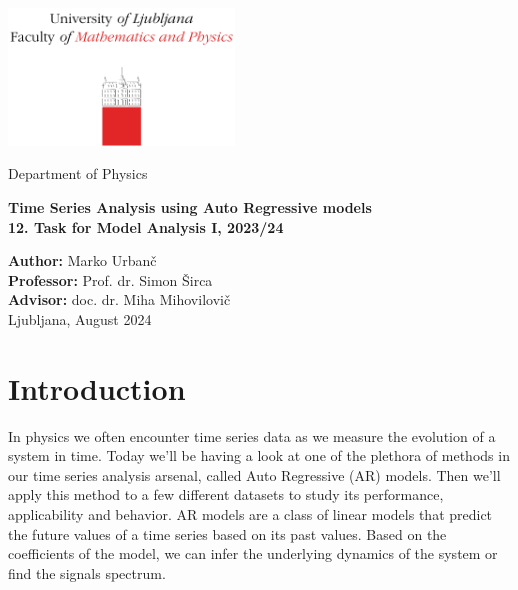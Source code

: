 \documentclass[10pt, titlepage, a4paper]{article}
\begin{document}
\begin{titlepage}
{\centering
\includegraphics[width=6cm]{logo_fmf.pdf}

\vspace{0.8cm}
{\small Department of Physics}

\vspace{5cm}
\vspace{0.5cm}
{\huge\textbf{Time Series Analysis using Auto Regressive models}} \\
\vspace{0.5cm}
{\large\textbf{12. Task for Model Analysis I, 2023/24}}

\vfill
\textbf{Author:} Marko Urbanč \\
\textbf{Professor:} Prof. dr. Simon Širca  \\ 
\textbf{Advisor:}  doc. dr. Miha Mihovilovič \\

\vspace{1cm}
Ljubljana, August 2024 \\
}
\vspace{3cm}
\end{titlepage}

\hypersetup{pageanchor=true}
\setcounter{page}{2}
\tableofcontents
\vspace{1cm}


\section{Introduction}
In physics we often encounter time series data as we measure the evolution of a system in time. Today we'll be having 
a look at one of the plethora of methods in our time series analysis arsenal, called Auto Regressive (AR) models. Then 
we'll apply this method to a few different datasets to study its performance, applicability and behavior. AR models are 
a class of linear models that predict the future values of a time series based on its past values. Based on the 
coefficients of the model, we can infer the underlying dynamics of the system or find the signals spectrum. \\
\end{document}
